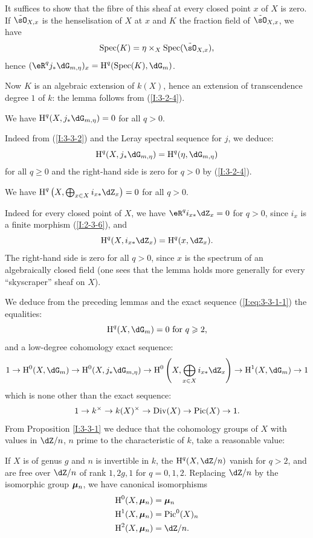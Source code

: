 It suffices to show that the fibre of this sheaf at every closed point $x$
of $X$ is zero. If $\tilde\sO_{X,x}$ is the henselisation of $X$ at $x$ and $K$
the fraction field of $\tilde\sO_{X,x}$, we have
\[
  \spec(K) = \eta\times_X \spec(\tilde\sO_{X,x})\text{,}
\]
hence $(\eR^qj_*\dG_{m,\eta})_x = \h^q(\spec(K),\dG_m)$.

Now $K$ is an algebraic extension of $k(X)$, hence an extension of
transcendence degree $1$ of $k$: the lemma follows from (\ref{I:3-2-4}). 





\begin{lemma}\label{I:3-3-3}
We have $\h^q(X, j_*\dG_{m,\eta}) = 0$ for all $q>0$.
\end{lemma}

Indeed from (\ref{I:3-3-2}) and the Leray spectral sequence for $j$, we
deduce:
\[
  \h^q(X, j_* \dG_{m,\eta}) = \h^q(\eta,\dG_{m,\eta})
\]
for all $q\geqslant 0$ and the right-hand side is zero for $q>0$ by
(\ref{I:3-2-4}). 





\begin{lemma}\label{I:3-3-4}
We have $\h^q\left(X,\bigoplus_{x\in X} i_{x*} \dZ_x\right) = 0$ for all $q>0$.
\end{lemma}

Indeed for every closed point of $X$, we have $\eR^q i_{x*}\dZ_x = 0$ for $q>0$,
since $i_x$ is a finite morphism (\ref{I:2-3-6}), and
\[
  \h^q(X,i_{x*}\dZ_x) = \h^q(x,\dZ_x)\text{.}
\]
The right-hand side is zero for all $q>0$, since $x$ is the spectrum of an
algebraically closed field (one sees that the lemma holds more
generally for every ``skyscraper'' sheaf on $X$).

We deduce from the preceding lemmas and the exact sequence (\ref{I:eq:3-3-1-1})
the equalities:
\[
  \h^q(X,\dG_m) = 0 \text{ for $q\geqslant 2$,}
\]
and a low-degree cohomology exact sequence:
\[
  1 \to \h^0(X,\dG_m) \to \h^0(X, j_*\dG_{m,\eta}) \to \h^0\left(X,\bigoplus_{x\in X} i_{x*}\dZ_x\right) \to \h^1(X,\dG_m) \to 1
\]
which is none other than the exact sequence:
\[
  1 \to k^\times \to k(X)^\times\to \operatorname{Div}(X) \to \operatorname{Pic}(X) \to 1\text{.}
\]
From Proposition \ref{I:3-3-1} we deduce that the cohomology groups of
$X$ with values in $\dZ/n$, $n$ prime to the characteristic of $k$, take
a reasonable value:





\begin{corollary}\label{I:3-3-5}
If $X$ is of genus $g$ and $n$ is invertible in $k$, the
$\h^q(X,\dZ/n)$ vanish for $q>2$, and are free over $\dZ/n$ of rank $1,2g,1$
for $q=0,1,2$. Replacing $\dZ/n$ by the isomorphic group ${\bm\mu}_n$, we have
canonical isomorphisms
\begin{align*}
  \h^0(X,\dmu_n) &= \dmu_n \\
  \h^1(X,\dmu_n) &= \pic^0(X)_n \\
  \h^2(X,\dmu_n) &= \dZ/n \text{.}
\end{align*}
\end{corollary}

